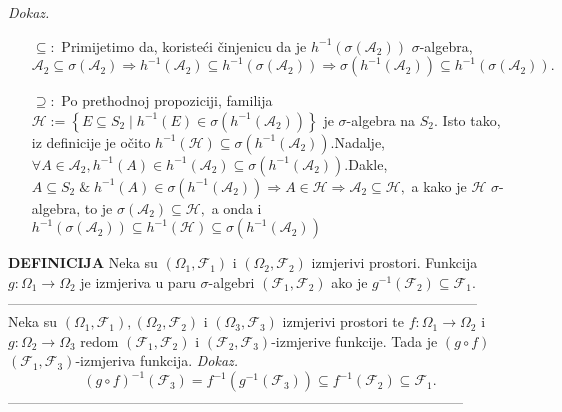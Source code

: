 \documentclass{article}
\begin{document}
\textit{Dokaz.}
\begin{itemize}
    \item[\(\boxed{\subseteq}:\)] Primijetimo da, koristeći činjenicu da je \(h^{-1}\left(\sigma(\mathcal A_2)\right)\) \(\sigma\)-algebra,  \[\mathcal A_2\subseteq\sigma(\mathcal A_2)\Rightarrow h^{-1}(\mathcal A_2)\subseteq h^{-1}\left(\sigma(\mathcal A_2)\right)\Rightarrow\sigma\left(h^{-1}(\mathcal A_2)\right)\subseteq h^{-1}\left(\sigma(\mathcal A_2)\right).\]
    \item[\(\boxed{\supseteq}:\)] Po prethodnoj propoziciji, familija \(\mathcal H:=\left\{E\subseteq S_2\mid h^{-1}(E)\in\sigma\left(h^{-1}(\mathcal A_2)\right)\right\}\) je \(\sigma\)-algebra na \(S_2.\) Isto tako, iz definicije je očito \(h^{-1}(\mathcal H)\subseteq\sigma\left(h^{-1}(\mathcal A_2)\right).\)\newline Nadalje, \(\forall A\in\mathcal A_2, h^{-1}(A)\in h^{-1}(\mathcal A_2)\subseteq\sigma\left(h^{-1}(\mathcal A_2)\right).\)\newline Dakle, \(A\subseteq S_2\;\&\; h^{-1}(A)\in\sigma\left(h^{-1}(\mathcal A_2)\right)\Rightarrow A\in\mathcal H\Rightarrow\mathcal A_2\subseteq\mathcal H,\) a kako je \(\mathcal H\) \(\sigma\)-algebra, to je \(\sigma(\mathcal A_2)\subseteq\mathcal H,\) a onda i \(h^{-1}(\sigma(\mathcal A_2))\subseteq h^{-1}(\mathcal H)\subseteq\sigma\left(h^{-1}(\mathcal A_2)\right)\) 
\end{itemize}
\textbf{DEFINICIJA}\newline
Neka su \((\Omega_1,\mathcal F_1)\) i \((\Omega_2,\mathcal F_2)\) izmjerivi prostori.  Funkcija \(g:\Omega_1\to\Omega_2\) je izmjeriva u paru \(\sigma\)-algebri \((\mathcal F_1,\mathcal F_2)\) ako je \(g^{-1}(\mathcal F_2)\subseteq\mathcal F_1.\)\newline\newline-----------------------------------------------------------------------------------------------------\newline\newline
Neka su \((\Omega_1,\mathcal F_1),(\Omega_2,\mathcal F_2)\) i \((\Omega_3,\mathcal F_3)\) izmjerivi prostori te \(f:\Omega_1\to\Omega_2\) i \(g:\Omega_2\to\Omega_3\) redom \((\mathcal F_1,\mathcal F_2)\) i \((\mathcal F_2,\mathcal F_3)\)-izmjerive funkcije. Tada je \((g\circ f)\) \((\mathcal F_1,\mathcal F_3)\)-izmjeriva funkcija.\newline\newline
\textit{Dokaz.} \[(g\circ f)^{-1}(\mathcal F_3)=f^{-1}\left(g^{-1}(\mathcal F_3)\right)\subseteq f^{-1}(\mathcal F_2)\subseteq\mathcal F_1.\]--------------------------------------------------------------------------------------------------\newline\newline 
\end{document}
